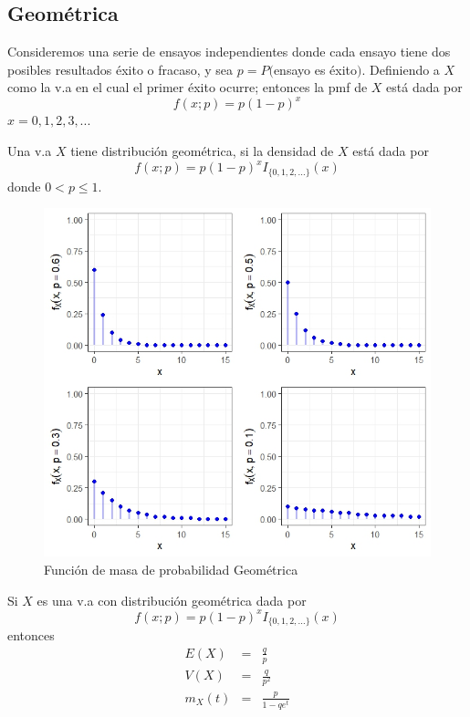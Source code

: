 \begin{i}
\subsection{Geométrica}


Consideremos una serie de ensayos independientes donde cada ensayo tiene dos posibles resultados éxito o fracaso, y sea $p=P($ensayo es éxito$)$. Definiendo a $X$ como la v.a en el cual el primer éxito ocurre; entonces la pmf de $X$ está dada por
\begin{equation*}
f(x;p)=p(1-p)^{x}
\end{equation*}%
$x=0,1,2,3,...$

\begin{definition}
Una v.a $X$ tiene distribución geométrica, si la densidad de $X$ está dada por
\begin{equation*}
f(x;p)=p(1-p)^{x}I_{\{0,1,2,...\}}(x)
\end{equation*}%
donde $0<p\leq 1.$
\end{definition}

\begin{figure}[h!]
\centering
\includegraphics[scale=1]{Figuras/Geometrica.jpeg}
\caption{Función de masa de probabilidad Geométrica}
\end{figure}

\begin{theorem}
Si $X$ es una v.a con distribución geométrica dada por
\begin{equation*}
f(x;p)=p(1-p)^{x}I_{\{0,1,2,...\}}(x)
\end{equation*}%
\bigskip entonces%
\begin{eqnarray*}
E(X) &=&\frac{q}{p} \\
V(X) &=&\frac{q}{p^{2}} \\
m_{X}(t) &=&\frac{p}{1-qe^{t}}
\end{eqnarray*}
\end{theorem}


\end{i}
